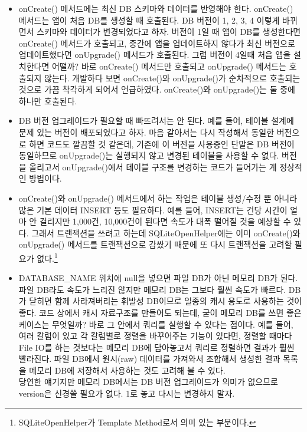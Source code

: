 \begin{itemize}
\item onCreate() 메서드에는 최신 DB 스키마와 데이터를 반영해야 한다. 
onCreate() 메서드는 앱이 처음 DB를 생성할 때 호출된다. DB 버전이 1, 2, 3, 4 이렇게 바뀌면서 스키마와 데이터가 변경되었다고 하자. 
버전이 1일 때 앱이 DB를 생성한다면 onCreate() 메서드가 호출되고, 중간에 앱을 업데이트하지 않다가 최신 버전으로 업데이트했다면 onUpgrade() 메서드가 호출된다.
그럼 버전이 4일때 처음 앱을 설치한다면 어떨까? 바로 onCreate() 메서드만 호출되고 onUpgrade() 메서드는 호출되지 않는다. 
개발하다 보면 onCreate()와 onUpgrade()가 순차적으로 호출되는 것으로 가끔 착각하게 되어서 언급하였다. onCreate()와 onUpgrade()는 둘 중에 하나만 호출된다.

\item DB 버전 업그레이드가 필요할 때 빠뜨려서는 안 된다. 예를 들어, 테이블 설계에 문제 있는 버전이 배포되었다고 하자.
마음 같아서는 다시 작성해서 동일한 버전으로 하면 코드도 깔끔할 것 같은데, 기존에 이 버전을 사용중인 단말은 DB 버전이 동일하므로 onUpgrade()는 실행되지 않고 변경된 테이블을 사용할 수 없다.
버전을 올리고서 onUpgrade()에서 테이블 구조를 변경하는 코드가 들어가는 게 정상적인 방법이다.

\item onCreate()와 onUpgrade() 메서드에서 하는 작업은 테이블 생성/수정 뿐 아니라 많은 기본 데이터 INSERT 등도 필요하다. 
예를 들어, INSERT는 건당 시간이 얼마 안 걸리지만 1,000건, 10,000건이 된다면 속도가 대폭 떨어질 것을 예상할 수 있다.
그래서 트랜잭션을 쓰려고 하는데 SQLiteOpenHelper에는 이미 onCreate()와 onUpgrade() 메서드를 트랜잭션으로 감쌌기 때문에 또 다시 트랜잭션을 고려할 필요가 없다.\footnote{SQLiteOpenHelper가 Template Method로서 의미 있는 부분이다.}

\item DATABASE\_NAME 위치에 null을 넣으면 파일 DB가 아닌 메모리 DB가 된다. 파일 DB라도 속도가 느리진 않지만 메모리 DB는 그보다 훨씬 속도가 빠르다. 
DB가 닫히면 함께 사라져버리는 휘발성 DB이므로 일종의 캐시 용도로 사용하는 것이 좋다.
코드 상에서 캐시 자료구조를 만들어도 되는데, 굳이 메모리 DB를 쓰면 좋은 케이스는 무엇일까? 바로 그 안에서 쿼리를 실행할 수 있다는 점이다.
예를 들어, 여러 칼럼이 있고 각 칼럼별로 정렬을 바꾸어주는 기능이 있다면, 정렬할 때마다 File IO를 하는 것보다는 메모리 DB에 담아놓고서 쿼리로 정렬하면 결과가 훨씬 빨라진다. 
파일 DB에서 원시(raw) 데이터를 가져와서 조합해서 생성한 결과 목록을 메모리 DB에 저장해서 사용하는 것도 고려해 볼 수 있다.\\

당연한 얘기지만 메모리 DB에서는 DB 버전 업그레이드가 의미가 없으므로 version은 신경쓸 필요가 없다. 1로 놓고 다시는 변경하지 말자.


\end{itemize}
